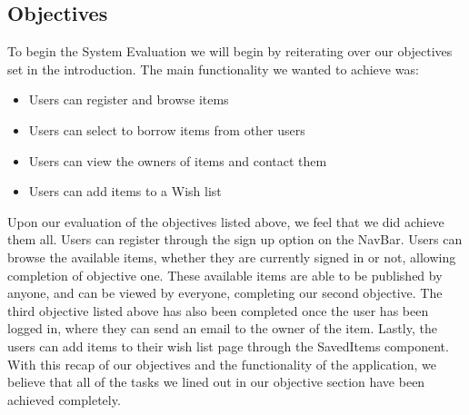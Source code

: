 \subsection{Objectives}
To begin the System Evaluation we will begin by reiterating over our objectives set in the introduction. The main functionality we wanted to achieve was:
\begin{itemize}
    \item Users can register and browse items

    \item Users can select to borrow items from other users

    \item Users can view the owners of items and contact them

    \item Users can add items to a Wish list
\end{itemize}
\par Upon our evaluation of the objectives listed above, we feel that we did achieve them all. Users can register through the sign up option on the NavBar. Users can browse the available items, whether they are currently signed in or not, allowing completion of objective one. These available items are able to be published by anyone, and can be viewed by everyone, completing our second objective. The third objective listed above has also been completed once the user has been logged in, where they can send an email to the owner of the item. Lastly, the users can add items to their wish list page through the SavedItems component. With this recap of our objectives and the functionality of the application, we believe that all of the tasks we lined out in our objective section have been achieved completely. \par

